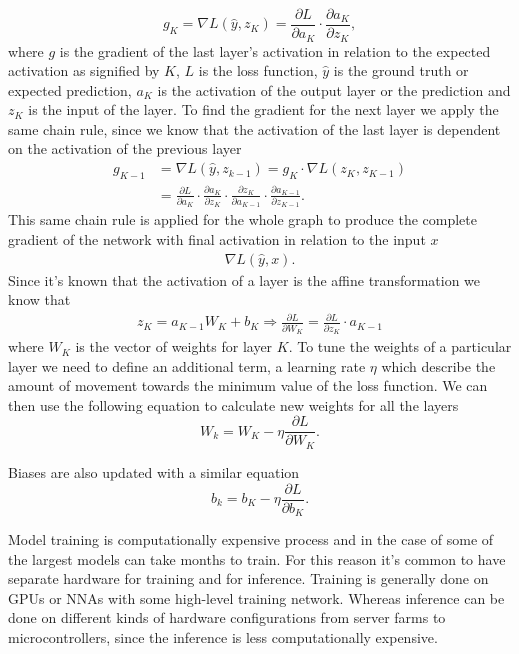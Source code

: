 \documentclass[12pt,a4paper,english
]{tunithesis}
\begin{document}
\begin{equation}
g_{K} = \nabla L (\hat{y}, z_{K}) = \frac{\partial L}{\partial a_{K}} \cdot \frac{\partial a_{K}}{\partial z_{K}},
\end{equation}
where $g$ is the gradient of the last layer's activation in relation to the expected activation as signified by $K$, $L$ is the loss function, $\hat{y}$ is the ground truth or expected prediction, $a_{K}$ is the activation of the output layer or the prediction and $z_{K}$ is the input of the layer.
To find the gradient for the next layer we apply the same chain rule, since we know that the activation of the last layer is dependent on the activation of the previous layer
\begin{align}
g_{K-1}& = \nabla L(\hat{y}, z_{k-1}) = g_{K} \cdot \nabla L(z_{K}, z_{K-1}) \\
& = \frac{\partial L}{\partial a_{K}} \cdot \frac{\partial a_{K}}{\partial z_{K}} \cdot \frac{\partial z_{K}}{\partial a_{K-1}} \cdot \frac{\partial a_{K-1}}{\partial z_{K-1}}.
\end{align}
This same chain rule is applied for the whole graph to produce the complete gradient of the network with final activation in relation to the input $x$
\begin{align}
\nabla L(\hat{y}, x).
\end{align}
Since it's known that the activation of a layer is the affine transformation we know that
\begin{align}
z_{K} = a_{K-1}W_{K} + b_{K} \Rightarrow \frac{\partial L}{\partial W_{K}} = \frac{\partial L}{\partial z_{K}} \cdot a_{K-1}
\end{align}
where $W_{K}$ is the vector of weights for layer $K$.
To tune the weights of a particular layer we need to define an additional term, a learning rate $\eta$ which describe the amount of movement towards the minimum value of the loss function. We can then use the following equation to calculate new weights for all the layers
\begin{equation}
W_{k} = W_{K} - \eta \frac{\partial L}{\partial W_{K}}.
\end{equation}

Biases are also updated with a similar equation
\begin{equation}
b_{k} = b_{K} - \eta \frac{\partial L}{\partial b_{K}}.
\end{equation}


Model training is computationally expensive process and in the case of some of the largest models can take months to train. For this reason it's common to have separate hardware for training and for inference. Training is generally done on GPUs or NNAs with some high-level training network. Whereas inference can be done on different kinds of hardware configurations from server farms to microcontrollers, since the inference is less computationally expensive.
\end{document}
